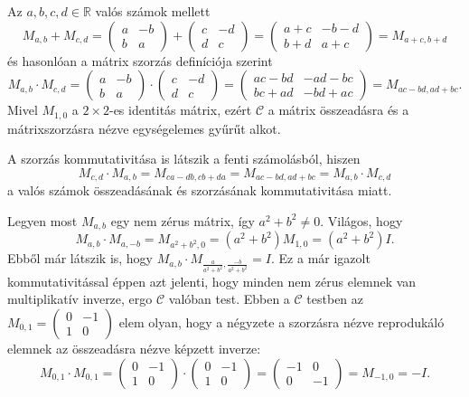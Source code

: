 \documentclass[9pt, a4paper, showtrims]{memoir}
\makeatletter
\renewenvironment{proof}[1][\proofname]
    {\par\pushQED{\qed}%
    \normalfont \topsep6\p@\@plus6\p@\relax
    \trivlist
    \item[\hskip\labelsep
        \itshape
    #1\@addpunct{:}]\ignorespaces}
    {\popQED\endtrivlist\@endpefalse}
\theoremstyle{plain}
\theoremstyle{remark}
\theoremstyle{definition}
\makeatother
\begin{document}
\begin{proof}
	Az $a,b,c,d\in\mathbb{R}$ valós számok mellett
	\[
		M_{a,b}+M_{c,d}=
		\begin{pmatrix}
			a & -b \\
			b & a
		\end{pmatrix}
		+
		\begin{pmatrix}
			c & -d \\
			d & c
		\end{pmatrix}
		=
		\begin{pmatrix}
			a+c & -b-d \\
			b+d & a+c
		\end{pmatrix}
		=
		M_{a+c,b+d}
	\]
	és hasonlóan a mátrix szorzás definíciója szerint
	\[
		M_{a,b}\cdot M_{c,d}=
		\begin{pmatrix}
			a & -b \\
			b & a
		\end{pmatrix}
		\cdot
		\begin{pmatrix}
			c & -d \\
			d & c
		\end{pmatrix}
		=
		\begin{pmatrix}
			ac-bd & -ad-bc \\
			bc+ad & -bd+ac
		\end{pmatrix}
		=
		M_{ac-bd,ad+bc}.
	\]
	Mivel $M_{1,0}$ a $2\times 2$-es identitás mátrix, ezért $\mathcal{C}$ a mátrix összeadásra és a mátrixszorzásra nézve
	egységelemes gyűrűt alkot.

	A szorzás kommutativitása is látszik a fenti számolásból, hiszen
	\[
		M_{c,d}\cdot M_{a,b}=M_{ca-db,cb+da}=M_{ac-bd,ad+bc}=M_{a,b}\cdot M_{c,d}
	\]
	a valós számok összeadásának és szorzásának
	kommutativitása miatt.

	Legyen most $M_{a,b}$ egy nem zérus mátrix, így $a^2+b^2\neq 0$.
	Világos, hogy
	\[
		M_{a,b}\cdot M_{a,-b}=M_{a^2+b^2,0}=\left( a^2+b^2 \right)M_{1,0}=\left( a^2+b^2 \right)I.
	\]
	Ebből már látszik is, hogy $M_{a,b}\cdot M_{\frac{a}{a^2+b^2},\frac{-b}{a^2+b^2}}=I$.
	Ez a már igazolt kommutativitással éppen azt jelenti, hogy minden nem zérus elemnek van multiplikatív inverze,
	ergo $\mathcal{C}$ valóban test.
\end{proof}
Ebben a $\mathcal{C}$ testben az
\(
M_{0,1}=
\begin{pmatrix}
	0 & -1 \\
	1 & 0
\end{pmatrix}
\)
elem olyan, hogy a négyzete a szorzásra nézve reprodukáló elemnek az összeadásra nézve képzett inverze:
\[
	M_{0,1}\cdot M_{0,1}
	=
	\begin{pmatrix}
		0 & -1 \\
		1 & 0
	\end{pmatrix}
	\cdot
	\begin{pmatrix}
		0 & -1 \\
		1 & 0
	\end{pmatrix}
	=
	\begin{pmatrix}
		-1 & 0  \\
		0  & -1
	\end{pmatrix}
	=
	M_{-1,0}
	=
	-I.
\]
\end{document}
